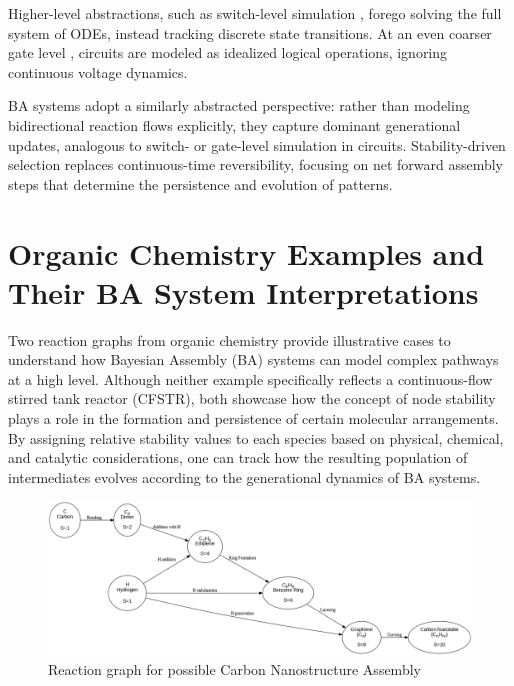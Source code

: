\documentclass[preprint,12pt]{elsarticle}
\begin{document}
Higher-level abstractions, such as switch-level simulation \cite{AdlerCAD}, forego solving the full system of ODEs, instead tracking discrete state transitions. At an even coarser gate level \cite{FeynmanComp}, circuits are modeled as idealized logical operations, ignoring continuous voltage dynamics.

BA systems adopt a similarly abstracted perspective: rather than modeling bidirectional reaction flows explicitly, they capture dominant generational updates, analogous to switch- or gate-level simulation in circuits. Stability-driven selection replaces continuous-time reversibility, focusing on net forward assembly steps that determine the persistence and evolution of patterns.

\section{Organic Chemistry Examples and Their BA System Interpretations}
\label{sec:organic-ba-examples}

Two reaction graphs from organic chemistry provide illustrative cases to understand how Bayesian Assembly (BA) systems can model complex pathways at a high level. Although neither example specifically reflects a continuous-flow stirred tank reactor (CFSTR), both showcase how the concept of node stability plays a role in the formation and persistence of certain molecular arrangements. By assigning relative stability values to each species based on physical, chemical, and catalytic considerations, one can track how the resulting population of intermediates evolves according to the generational dynamics of BA systems.

\begin{figure}[h]
    \centering
    \includegraphics[width=1\textwidth,height=0.55\textwidth]{figure_7.png}
    \caption{Reaction graph for possible Carbon Nanostructure Assembly}
    \label{fig:figure_7}
\end{figure}
\end{document}

